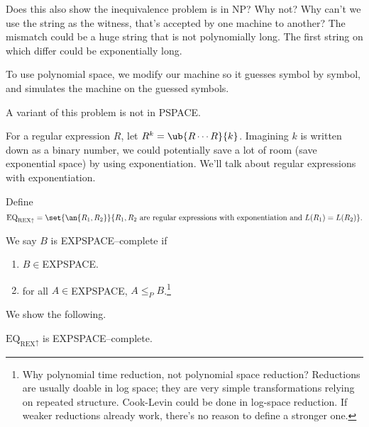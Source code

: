 Does this also show the inequivalence problem is in NP? Why not? Why can't we use the string as the witness, that's accepted by one machine to another? The mismatch could be a huge string that is not polynomially long. The first string on which differ could be exponentially long.

To use polynomial space, we modify our machine so it guesses symbol by symbol, and simulates the machine on the guessed symbols. %

A variant of this problem is not in PSPACE.

For a regular expression $R$, let $R^k=\ub{R\cdots R}{k}$. Imagining $k$ is written down as a binary number, we could potentially save a lot of room (save exponential space) by using exponentiation. We'll talk about regular expressions with exponentiation.
\begin{df}
Define
\[
\text{EQ}_{\text{REX}\uparrow}=\set{
\an{R_1,R_2}
}{R_1,R_2\text{ are regular expressions with exponentiation and }L(R_1)=L(R_2)}.
\]
\end{df}
\begin{df}
We say $B$ is EXPSPACE--complete if
\begin{enumerate}
\item
$B\in$EXPSPACE.
\item
for all $A\in$EXPSPACE, $A\le_PB$.\footnote{Why polynomial time reduction, not polynomial space reduction? Reductions are usually doable in log space; they are very simple transformations relying on repeated structure. Cook-Levin could be done in log-space reduction. If weaker reductions already work, there's no reason to define a stronger one.}
\end{enumerate}
\end{df}
We show the following.
\begin{thm}
$\text{EQ}_{\text{REX}\uparrow}$ is EXPSPACE--complete.
\end{thm}
